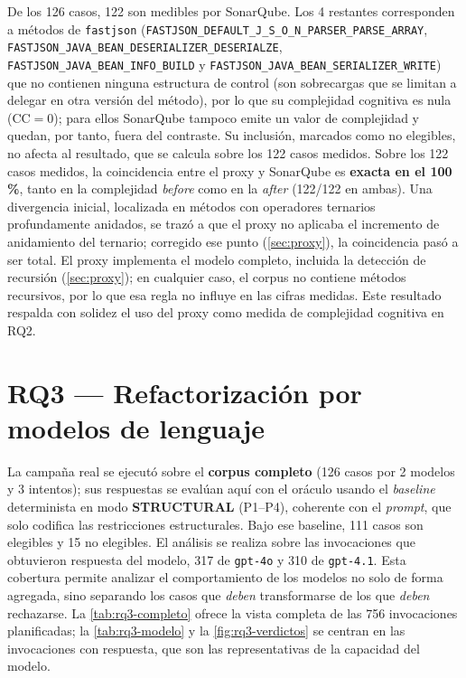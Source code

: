 De los 126 casos, 122 son medibles por SonarQube. Los 4 restantes corresponden
a métodos de \texttt{fastjson}
(\texttt{FASTJSON\_DEFAULT\_J\_S\_O\_N\_PARSER\_PARSE\_ARRAY},
\texttt{FASTJSON\_JAVA\_BEAN\_DESERIALIZER\_DESERIALZE},
\texttt{FASTJSON\_JAVA\_BEAN\_INFO\_BUILD} y
\texttt{FASTJSON\_JAVA\_BEAN\_SERIALIZER\_WRITE}) que no contienen ninguna
estructura de control (son sobrecargas que se limitan a delegar en otra versión
del método), por lo que su complejidad cognitiva es nula (CC${}=0$); para ellos
SonarQube tampoco emite un valor de complejidad y quedan, por tanto, fuera del
contraste. Su inclusión, marcados como no elegibles, no afecta al resultado,
que se calcula sobre los 122 casos medidos. Sobre los 122 casos
medidos, la coincidencia entre el proxy y SonarQube es \textbf{exacta en el
100\,\%}, tanto en la complejidad \emph{before} como en la \emph{after}
(122/122 en ambas). Una divergencia inicial, localizada en métodos con
operadores ternarios profundamente anidados, se trazó a que el proxy no
aplicaba el incremento de anidamiento del ternario; corregido ese punto
(\autoref{sec:proxy}), la coincidencia pasó a ser total. El proxy implementa el modelo completo, incluida la detección de recursión
(\autoref{sec:proxy}); en cualquier caso, el corpus no contiene métodos
recursivos, por lo que esa regla no influye en las cifras medidas. Este resultado respalda con solidez el uso
del proxy como medida de complejidad cognitiva en RQ2.

\section{RQ3 — Refactorización por modelos de lenguaje}
\label{sec:resultados-rq3}
La campaña real se ejecutó sobre el \textbf{corpus completo} (126 casos por 2
modelos y 3 intentos); sus respuestas se evalúan aquí con el oráculo usando el
\emph{baseline} determinista en modo \textbf{STRUCTURAL} (P1--P4), coherente con
el \emph{prompt}, que solo codifica las restricciones estructurales. Bajo ese
baseline, 111 casos son elegibles y 15 no elegibles. El análisis se realiza
sobre las invocaciones que obtuvieron respuesta del modelo, 317 de
\texttt{gpt-4o} y 310 de \texttt{gpt-4.1}. Esta
cobertura permite analizar el comportamiento de los modelos no solo de forma
agregada, sino separando los casos que \emph{deben} transformarse de los que
\emph{deben} rechazarse. La \autoref{tab:rq3-completo} ofrece la vista
completa de las 756 invocaciones planificadas; la
\autoref{tab:rq3-modelo} y la \autoref{fig:rq3-verdictos} se centran en las
invocaciones con respuesta, que son las representativas de la capacidad del modelo.

